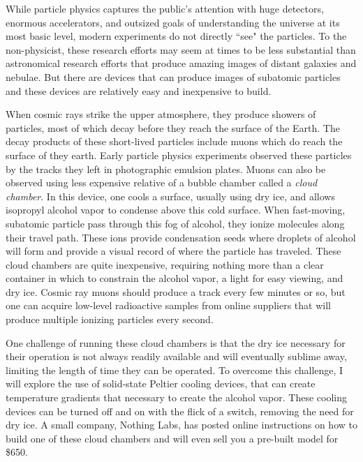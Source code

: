 
While particle physics captures the public's attention with huge detectors,
enormous accelerators, and outsized goals of understanding the universe
at its most basic level, modern experiments do not directly ``see" the particles.
To the non-physicist, these research efforts may seem at times to be
less substantial than astronomical research efforts that produce amazing
images of distant galaxies and nebulae. But there are devices that
can produce images of subatomic particles and these devices are relatively
easy and inexpensive to build.

When cosmic rays strike the upper atmosphere, they produce showers
of particles, most of which decay before they reach the surface
of the Earth. The decay products of these short-lived particles
include muons which do reach the surface of they earth. Early particle
physics experiments observed these particles by the tracks they left in
photographic emulsion plates.
Muons can also be observed using less expensive relative of a bubble chamber called
a {\it cloud chamber}. In this device, one cools a surface, usually using
dry ice, and allows isopropyl alcohol vapor to condense above
this cold surface. When fast-moving, subatomic particle pass
through this fog of alcohol, they ionize molecules along their travel path.
These ions provide condensation seeds where droplets of alcohol will form and
provide a visual record of where the particle has traveled.
These cloud chambers are quite inexpensive, requiring nothing more
than a clear container in which to constrain the alcohol vapor,
a light for easy viewing, and dry ice. Cosmic ray muons should produce
a track every few minutes or so, but one can acquire low-level radioactive samples
from online suppliers that will produce multiple ionizing particles
every second.

One challenge of running these cloud chambers is that the dry
ice necessary for their operation is not always readily available and
will eventually sublime away, limiting the length of time they can
be operated. To overcome this challenge, I will explore the use of
solid-state Peltier cooling devices\cite{peltier}, that
can create temperature gradients that necessary to create the alcohol vapor.
These cooling devices can be turned off and on with
the flick of a switch, removing the need for dry ice. A small company,
Nothing Labs\cite{nothinglabs}, has posted online
instructions on how to build one of these cloud chambers\cite{nothinglabs_cc}
and will even sell you a pre-built model for \$650.


